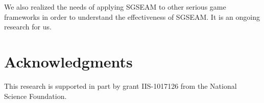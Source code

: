 \documentclass{sigchi}
\begin{document}
We also realized the needs of applying SGSEAM to other serious game frameworks in order to
understand the effectiveness of SGSEAM.  It is an ongoing research for us.

\section{Acknowledgments}
This research is supported in part by grant IIS-1017126
from the National Science Foundation.


%
%
%
%
%
\balance



\end{document}
